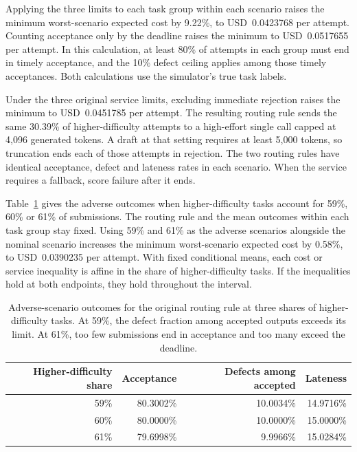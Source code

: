 \documentclass[11pt,reqno]{amsart}
\theoremstyle{definition}
\theoremstyle{remark}
\begin{document}
Applying the three limits to each task group within each scenario raises the minimum worst-scenario expected cost by 9.22\%, to USD~0.0423768 per attempt.
Counting acceptance only by the deadline raises the minimum to USD~0.0517655 per attempt. In this calculation, at least 80\% of attempts in each group must end in timely acceptance, and the 10\% defect ceiling applies among those timely acceptances. Both calculations use the simulator's true task labels.

Under the three original service limits, excluding immediate rejection raises the minimum to USD~0.0451785 per attempt. The resulting routing rule sends the same 30.39\% of higher-difficulty attempts to a high-effort single call capped at 4,096 generated tokens. A draft at that setting requires at least 5,000 tokens, so truncation ends each of those attempts in rejection. The two routing rules have identical acceptance, defect and lateness rates in each scenario. When the service requires a fallback, score failure after it ends.

Table~\ref{tab:mix-sensitivity} gives the adverse outcomes when higher-difficulty tasks account for 59\%, 60\% or 61\% of submissions. The routing rule and the mean outcomes within each task group stay fixed.
Using 59\% and 61\% as the adverse scenarios alongside the nominal scenario increases the minimum worst-scenario expected cost by 0.58\%, to USD~0.0390235 per attempt. With fixed conditional means, each cost or service inequality is affine in the share of higher-difficulty tasks. If the inequalities hold at both endpoints, they hold throughout the interval.

\begin{table}[H]
\centering
\small
\begin{tabular}{@{}rrrr@{}}
\toprule
Higher-difficulty share & Acceptance & Defects among accepted & Lateness \\
\midrule
59\% & 80.3002\% & 10.0034\% & 14.9716\% \\
60\% & 80.0000\% & 10.0000\% & 15.0000\% \\
61\% & 79.6998\% & 9.9966\% & 15.0284\% \\
\bottomrule
\end{tabular}
\caption{Adverse-scenario outcomes for the original routing rule at three shares of higher-difficulty tasks. At 59\%, the defect fraction among accepted outputs exceeds its limit. At 61\%, too few submissions end in acceptance and too many exceed the deadline.}
\label{tab:mix-sensitivity}
\end{table}
\end{document}
